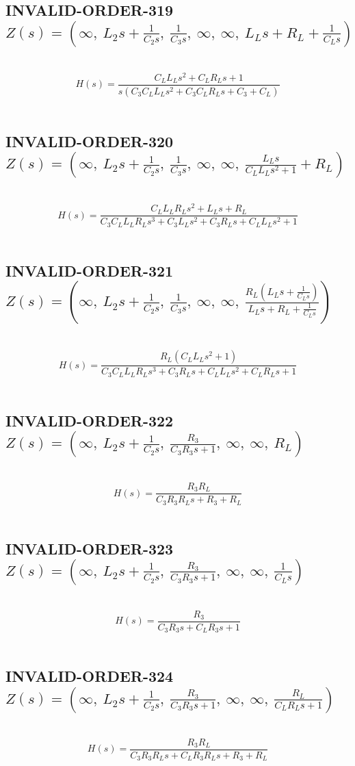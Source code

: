 \documentclass{article}
\begin{document}
\subsection{INVALID-ORDER-319 $Z(s) = \left( \infty, \  L_{2} s + \frac{1}{C_{2} s}, \  \frac{1}{C_{3} s}, \  \infty, \  \infty, \  L_{L} s + R_{L} + \frac{1}{C_{L} s}\right)$ } \ 
\textbf{\[H(s) = \frac{C_{L} L_{L} s^{2} + C_{L} R_{L} s + 1}{s \left(C_{3} C_{L} L_{L} s^{2} + C_{3} C_{L} R_{L} s + C_{3} + C_{L}\right)}\] } \ 
\subsection{INVALID-ORDER-320 $Z(s) = \left( \infty, \  L_{2} s + \frac{1}{C_{2} s}, \  \frac{1}{C_{3} s}, \  \infty, \  \infty, \  \frac{L_{L} s}{C_{L} L_{L} s^{2} + 1} + R_{L}\right)$ } \ 
\textbf{\[H(s) = \frac{C_{L} L_{L} R_{L} s^{2} + L_{L} s + R_{L}}{C_{3} C_{L} L_{L} R_{L} s^{3} + C_{3} L_{L} s^{2} + C_{3} R_{L} s + C_{L} L_{L} s^{2} + 1}\] } \ 
\subsection{INVALID-ORDER-321 $Z(s) = \left( \infty, \  L_{2} s + \frac{1}{C_{2} s}, \  \frac{1}{C_{3} s}, \  \infty, \  \infty, \  \frac{R_{L} \left(L_{L} s + \frac{1}{C_{L} s}\right)}{L_{L} s + R_{L} + \frac{1}{C_{L} s}}\right)$ } \ 
\textbf{\[H(s) = \frac{R_{L} \left(C_{L} L_{L} s^{2} + 1\right)}{C_{3} C_{L} L_{L} R_{L} s^{3} + C_{3} R_{L} s + C_{L} L_{L} s^{2} + C_{L} R_{L} s + 1}\] } \ 
\subsection{INVALID-ORDER-322 $Z(s) = \left( \infty, \  L_{2} s + \frac{1}{C_{2} s}, \  \frac{R_{3}}{C_{3} R_{3} s + 1}, \  \infty, \  \infty, \  R_{L}\right)$ } \ 
\textbf{\[H(s) = \frac{R_{3} R_{L}}{C_{3} R_{3} R_{L} s + R_{3} + R_{L}}\] } \ 
\subsection{INVALID-ORDER-323 $Z(s) = \left( \infty, \  L_{2} s + \frac{1}{C_{2} s}, \  \frac{R_{3}}{C_{3} R_{3} s + 1}, \  \infty, \  \infty, \  \frac{1}{C_{L} s}\right)$ } \ 
\textbf{\[H(s) = \frac{R_{3}}{C_{3} R_{3} s + C_{L} R_{3} s + 1}\] } \ 
\subsection{INVALID-ORDER-324 $Z(s) = \left( \infty, \  L_{2} s + \frac{1}{C_{2} s}, \  \frac{R_{3}}{C_{3} R_{3} s + 1}, \  \infty, \  \infty, \  \frac{R_{L}}{C_{L} R_{L} s + 1}\right)$ } \ 
\textbf{\[H(s) = \frac{R_{3} R_{L}}{C_{3} R_{3} R_{L} s + C_{L} R_{3} R_{L} s + R_{3} + R_{L}}\] } \ 
\end{document}
